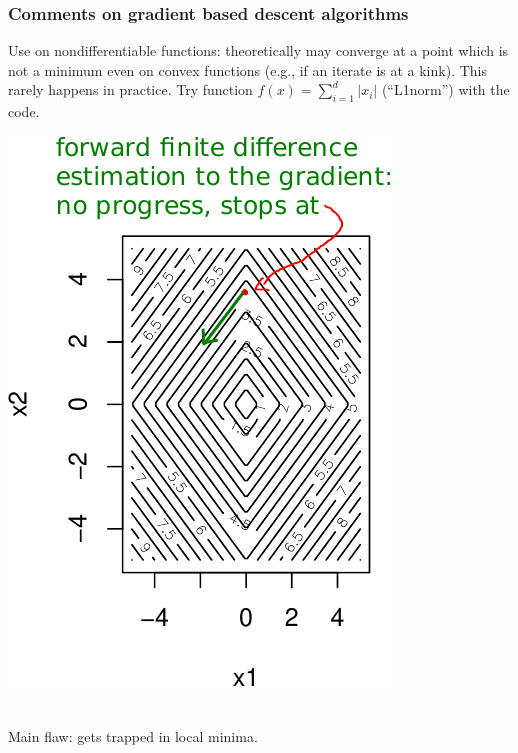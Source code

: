 \documentclass[12pt]{beamer}
\begin{document}
\begin{frame}
\frametitle{Comments on gradient based descent algorithms} 
\begin{minipage}[c]{0.5\textwidth}
Use on nondifferentiable functions: theoretically may converge at a point which is not a minimum even on convex functions (e.g., if an iterate is at a kink). This rarely happens in practice. 
Try function $f(x) = \sum_{i=1}^d \lvert x_i \rvert$ (``L1norm'') with the code. 
\end{minipage}
\begin{minipage}[c]{0.4\textwidth}
\includegraphics[width=\textwidth]{L1norm_contour-premconv-crop.pdf} 
\end{minipage}
\\
Main flaw: gets trapped in local minima.
\end{frame}
\end{document}
